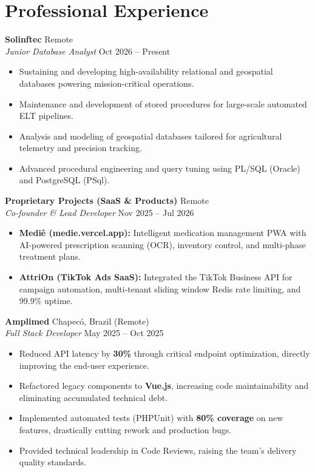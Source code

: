 \documentclass[a4paper,10pt]{article}
\begin{document}
\section{Professional Experience}

\noindent \textbf{Solinftec} \hfill Remote \\
\textit{Junior Database Analyst} \hfill Oct 2026 -- Present
\begin{itemize}[noitemsep, topsep=2pt]
    \item Sustaining and developing high-availability relational and geospatial databases powering mission-critical operations.
    \item Maintenance and development of stored procedures for large-scale automated ELT pipelines.
    \item Analysis and modeling of geospatial databases tailored for agricultural telemetry and precision tracking.
    \item Advanced procedural engineering and query tuning using PL/SQL (Oracle) and PostgreSQL (PSql).
\end{itemize}

\vspace{3pt}

\noindent \textbf{Proprietary Projects (SaaS \& Products)} \hfill Remote \\
\textit{Co-founder \& Lead Developer} \hfill Nov 2025 -- Jul 2026
\begin{itemize}[noitemsep, topsep=2pt]
    \item \textbf{Medi\^{e} (medie.vercel.app):} Intelligent medication management PWA with AI-powered prescription scanning (OCR), inventory control, and multi-phase treatment plans.
    \item \textbf{AttriOn (TikTok Ads SaaS):} Integrated the TikTok Business API for campaign automation, multi-tenant sliding window Redis rate limiting, and 99.9\% uptime.
\end{itemize}

\vspace{3pt}

\noindent \textbf{Amplimed} \hfill Chapecó, Brazil (Remote) \\
\textit{Full Stack Developer} \hfill May 2025 -- Oct 2025
\begin{itemize}[noitemsep, topsep=2pt]
    \item Reduced API latency by \textbf{30\%} through critical endpoint optimization, directly improving the end-user experience.
    \item Refactored legacy components to \textbf{Vue.js}, increasing code maintainability and eliminating accumulated technical debt.
    \item Implemented automated tests (PHPUnit) with \textbf{80\% coverage} on new features, drastically cutting rework and production bugs.
    \item Provided technical leadership in Code Reviews, raising the team's delivery quality standards.
\end{itemize}
\end{document}
